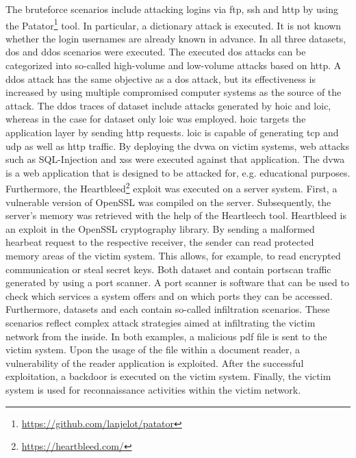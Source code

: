 \documentclass[../../main.tex]{subfiles}
\begin{document}
The bruteforce scenarios include attacking logins via \gls{ftp}, \gls{ssh} and \gls{http} by using the Patator\footnote{\url{https://github.com/lanjelot/patator}} tool. In particular, a dictionary attack is executed. It is not known whether the login usernames are already known in advance. In all three datasets, \gls{dos} and \gls{ddos} scenarios were executed. The executed \gls{dos} attacks can be categorized into so-called high-volume and low-volume \cite{cambiaso2013slow} attacks based on \gls{http}. A \gls{ddos} attack has the same objective as a \gls{dos} attack, but its effectiveness is increased by using multiple compromised computer systems as the source of the attack. The \gls{ddos} traces of dataset  include attacks generated by \gls{hoic} and \gls{loic}, whereas in the case for dataset  only \gls{loic} was employed. \gls{hoic} targets the application layer by sending \gls{http} requests. \gls{loic} is capable of generating \gls{tcp} and \gls{udp} as well as \gls{http} traffic. By deploying the \gls{dvwa} on victim systems, web attacks such as SQL-Injection and \gls{xss} were executed against that application. The \gls{dvwa} is a web application that is designed to be attacked for, e.g. educational purposes. Furthermore, the Heartbleed\footnote{\url{https://heartbleed.com/}} exploit was executed on a server system. First, a vulnerable version of OpenSSL was compiled on the server. Subsequently, the server's memory was retrieved with the help of the Heartleech tool. Heartbleed is an exploit in the OpenSSL cryptography library. By sending a malformed hearbeat request to the respective receiver, the sender can read protected memory areas of the victim system. This allows, for example, to read encrypted communication or steal secret keys. Both dataset  and  contain portscan traffic generated by using a port scanner. A port scanner is software that can be used to check which services a system offers and on which ports they can be accessed. Furthermore, datasets  and  each contain so-called infiltration scenarios. These scenarios reflect complex attack strategies aimed at infiltrating the victim network from the inside. In both examples, a malicious \gls{pdf} file is sent to the victim system. Upon the usage of the file within a document reader, a vulnerability of the reader application is exploited. After the successful exploitation, a backdoor is executed on the victim system. Finally, the victim system is used for reconnaissance activities within the victim network.
\end{document}
